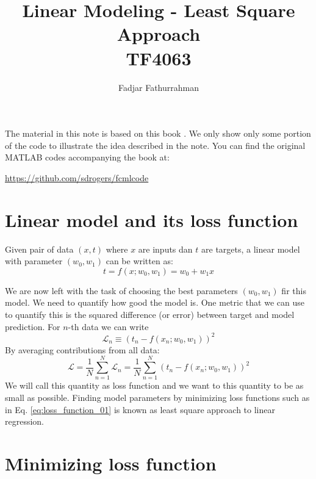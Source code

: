 




\title{Linear Modeling - Least Square Approach \\
TF4063}
\author{Fadjar Fathurrahman}
\date{}
\maketitle

The material in this note is based on this book \citep{Rogers2017}.
We only show only some portion of the code to illustrate the idea described in the
note. You can find the original MATLAB codes accompanying the book at:

{\footnotesize
\url{https://github.com/sdrogers/fcmlcode}
}

\section{Linear model and its loss function}

Given pair of data $(x,t)$ where $x$ are inputs dan $t$
are targets, a linear model with parameter $(w_0, w_1)$ can
be written as:
\begin{equation}
t = f(x; w_0, w_1) = w_0 + w_1 x
\label{eq:model_linear_01}
\end{equation}

We are now left with the task of choosing the best parameters $(w_0, w_1)$
fir this model.
We need to quantify how good the model is.
One metric that we can use to quantify this is the squared difference (or
error) between target and model prediction. For $n$-th data we can write
\begin{equation}
\mathcal{L}_n \equiv \left( t_n - f(x_n; w_0, w_1) \right)^2
\end{equation}
%
By averaging contributions from all data:
\begin{equation}
\mathcal{L} = \frac{1}{N} \sum_{n=1}^{N} \mathcal{L}_n =
\frac{1}{N} \sum_{n=1}^{N} \left( t_n - f(x_n; w_0, w_1) \right)^2
\label{eq:loss_function_01}
\end{equation}
We will call this quantity as loss function
and we want to this quantity to be as small as possible.
Finding model parameters by minimizing loss functions such as
in Eq. \eqref{eq:loss_function_01}
is known as least square approach to linear regression.


\section{Minimizing loss function}

